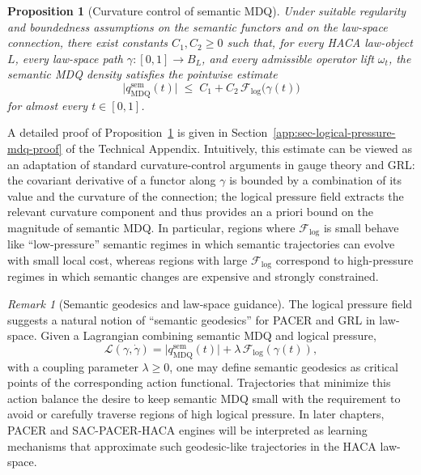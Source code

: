 \documentclass[11pt]{book}
\theoremstyle{plain}
\newtheorem{proposition}[theorem]{Proposition}
\theoremstyle{definition}
\theoremstyle{remark}
\newtheorem{remark}[theorem]{Remark}
\begin{document}
\begin{proposition}[Curvature control of semantic MDQ]
\label{prop:logical-pressure-mdq-control}
Under suitable regularity and boundedness assumptions on the semantic
functors and on the law-space connection, there exist constants
$C_1,C_2\ge 0$ such that, for every HACA law-object $L$, every
law-space path $\gamma:[0,1]\to B_L$, and every admissible operator
lift $\omega_t$, the semantic MDQ density satisfies the pointwise
estimate
\[
  \bigl|q_{\mathrm{MDQ}}^{\mathrm{sem}}(t)\bigr|
  \;\le\;
  C_1 + C_2\,\mathcal{F}_{\mathrm{log}}\bigl(\gamma(t)\bigr)
\]
for almost every $t\in[0,1]$.
\end{proposition}

A detailed proof of
Proposition~\ref{prop:logical-pressure-mdq-control}
is given in Section~\ref{app:sec-logical-pressure-mdq-proof} of the
Technical Appendix. Intuitively, this estimate can be viewed as an
adaptation of standard curvature-control arguments in gauge theory and
GRL: the covariant derivative of a functor along $\gamma$ is bounded
by a combination of its value and the curvature of the connection; the
logical pressure field extracts the relevant curvature component and
thus provides an a priori bound on the magnitude of semantic MDQ. In
particular, regions where $\mathcal{F}_{\mathrm{log}}$ is small behave
like ``low-pressure'' semantic regimes in which semantic trajectories
can evolve with small local cost, whereas regions with large
$\mathcal{F}_{\mathrm{log}}$ correspond to high-pressure regimes in
which semantic changes are expensive and strongly constrained.

\begin{remark}[Semantic geodesics and law-space guidance]
\label{rem:semantic-geodesics}
The logical pressure field suggests a natural notion of
``semantic geodesics'' for PACER and GRL in law-space. Given a
Lagrangian combining semantic MDQ and logical pressure,
\[
  \mathcal{L}(\gamma,\dot{\gamma})
  =
  \bigl|q_{\mathrm{MDQ}}^{\mathrm{sem}}(t)\bigr|
  + \lambda\,\mathcal{F}_{\mathrm{log}}(\gamma(t)),
\]
with a coupling parameter $\lambda\ge 0$, one may define semantic
geodesics as critical points of the corresponding action functional.
Trajectories that minimize this action balance the desire to keep
semantic MDQ small with the requirement to avoid or carefully traverse
regions of high logical pressure. In later chapters, PACER and
SAC-PACER-HACA engines will be interpreted as learning mechanisms that
approximate such geodesic-like trajectories in the HACA law-space.
\end{remark}
\end{document}
